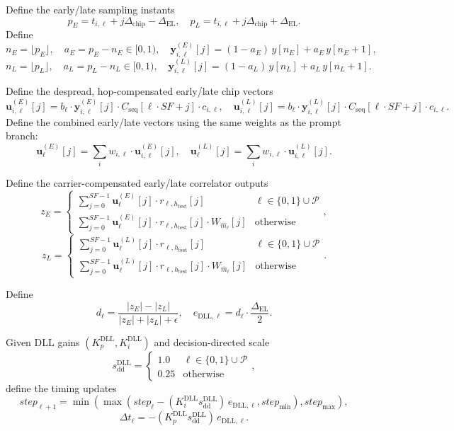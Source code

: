 \documentclass[11pt]{article}
\begin{document}
Define the early/late sampling instants
\[
  p_E=t_{i,\ell}+j\Delta_{\text{chip}}-\Delta_{\text{EL}},\quad
  p_L=t_{i,\ell}+j\Delta_{\text{chip}}+\Delta_{\text{EL}}.
\]
Define
\[
  n_E=\lfloor p_E\rfloor,\quad a_E=p_E-n_E\in[0,1),\quad \mathbf{y}_{i,\ell}^{(E)}[j]=(1-a_E)\,y[n_E]+a_E\,y[n_E+1],
\]
\[
  n_L=\lfloor p_L\rfloor,\quad a_L=p_L-n_L\in[0,1),\quad \mathbf{y}_{i,\ell}^{(L)}[j]=(1-a_L)\,y[n_L]+a_L\,y[n_L+1].
\]

Define the despread, hop-compensated early/late chip vectors
\[
  \mathbf{u}_{i,\ell}^{(E)}[j]=b_\ell\cdot \mathbf{y}_{i,\ell}^{(E)}[j]\cdot C_{\text{seq}}[\ell\cdot \mathit{SF}+j]\cdot c_{i,\ell},\quad
  \mathbf{u}_{i,\ell}^{(L)}[j]=b_\ell\cdot \mathbf{y}_{i,\ell}^{(L)}[j]\cdot C_{\text{seq}}[\ell\cdot \mathit{SF}+j]\cdot c_{i,\ell}.
\]
Define the combined early/late vectors using the same weights as the prompt branch:
\[
  \mathbf{u}_{\ell}^{(E)}[j]=\sum_i w_{i,\ell}\cdot \mathbf{u}_{i,\ell}^{(E)}[j],\quad
  \mathbf{u}_{\ell}^{(L)}[j]=\sum_i w_{i,\ell}\cdot \mathbf{u}_{i,\ell}^{(L)}[j].
\]

Define the carrier-compensated early/late correlator outputs
\[
  z_E=
  \begin{cases}
  \sum_{j=0}^{\mathit{SF}-1}\mathbf{u}_{\ell}^{(E)}[j]\cdot r_{\ell,h_{\text{best}}}[j] & \ell\in\{0,1\}\cup\mathcal{P}\\
  \sum_{j=0}^{\mathit{SF}-1}\mathbf{u}_{\ell}^{(E)}[j]\cdot r_{\ell,h_{\text{best}}}[j]\cdot W_{\hat m_\ell}[j] & \text{otherwise}
  \end{cases},
\]
\[
  z_L=
  \begin{cases}
  \sum_{j=0}^{\mathit{SF}-1}\mathbf{u}_{\ell}^{(L)}[j]\cdot r_{\ell,h_{\text{best}}}[j] & \ell\in\{0,1\}\cup\mathcal{P}\\
  \sum_{j=0}^{\mathit{SF}-1}\mathbf{u}_{\ell}^{(L)}[j]\cdot r_{\ell,h_{\text{best}}}[j]\cdot W_{\hat m_\ell}[j] & \text{otherwise}
  \end{cases}.
\]

Define
\[
  d_\ell=\frac{|z_E|-|z_L|}{|z_E|+|z_L|+\epsilon},\quad
  e_{\text{DLL},\ell}=d_\ell\cdot\frac{\Delta_{\text{EL}}}{2}.
\]

Given DLL gains $(K_p^{\text{DLL}},K_i^{\text{DLL}})$ and decision-directed scale
\[
  s_{\text{dd}}^{\text{DLL}}=
  \begin{cases}
  1.0 & \ell\in\{0,1\}\cup\mathcal{P}\\
  0.25 & \text{otherwise}
  \end{cases},
\]
define the timing updates
\[
  \mathit{step}_{\ell+1}=\min\!\left(\max\!\left(\mathit{step}_\ell - (K_i^{\text{DLL}} s_{\text{dd}}^{\text{DLL}})\,e_{\text{DLL},\ell},\mathit{step}_{\min}\right),\mathit{step}_{\max}\right),
\]
\[
  \Delta t_\ell = -(K_p^{\text{DLL}} s_{\text{dd}}^{\text{DLL}})\,e_{\text{DLL},\ell}.
\]
\end{document}

